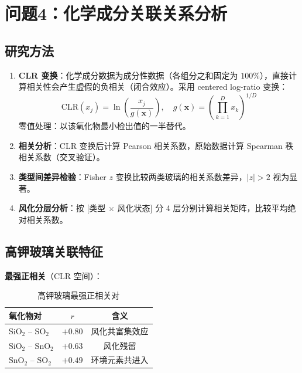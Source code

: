 \section{问题4：化学成分关联关系分析}

\subsection{研究方法}

\begin{enumerate}[label=(\arabic*)]
    \item \textbf{CLR 变换}：化学成分数据为成分性数据（各组分之和固定为 $100\%$），直接计算相关性会产生虚假的负相关（闭合效应）。采用 centered log-ratio 变换：
    \begin{equation}
        \text{CLR}(x_j) = \ln\left(\frac{x_j}{g(\mathbf{x})}\right), \quad g(\mathbf{x}) = \left(\prod_{k=1}^{D} x_k\right)^{1/D}
    \end{equation}
    零值处理：以该氧化物最小检出值的一半替代。

    \item \textbf{相关分析}：CLR 变换后计算 Pearson 相关系数，原始数据计算 Spearman 秩相关系数（交叉验证）。

    \item \textbf{类型间差异检验}：Fisher $z$ 变换比较两类玻璃的相关系数差异，$|z| > 2$ 视为显著。

    \item \textbf{风化分层分析}：按 [类型 $\times$ 风化状态] 分 4 层分别计算相关矩阵，比较平均绝对相关系数。
\end{enumerate}

\subsection{高钾玻璃关联特征}

\textbf{最强正相关}（CLR 空间）：

\begin{table}[H]
    \centering
    \caption{高钾玻璃最强正相关对}
    \label{tab:hk_pos_corr}
    \begin{tabular}{l c c}
        \toprule
        \textbf{氧化物对} & \textbf{$r$} & \textbf{含义} \\
        \midrule
        $\text{SiO}_2$ -- $\text{SO}_2$ & $+0.80$ & 风化共富集效应 \\
        $\text{SiO}_2$ -- $\text{SnO}_2$ & $+0.63$ & 风化残留 \\
        $\text{SnO}_2$ -- $\text{SO}_2$ & $+0.49$ & 环境元素共进入 \\
        \bottomrule
    \end{tabular}
\end{table}

